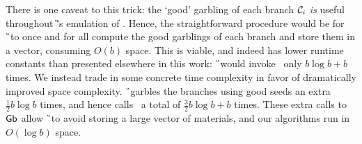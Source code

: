There is one caveat to this trick:
the `good' garbling of each branch $\mathcal C_i$ \emph{is} useful throughout \G's
emulation of \E.
Hence, the straightforward procedure would be for \G\ to once and for
all compute the good garblings of each branch and store them in a
vector, consuming $O(b)$ space.
%
This is viable, and indeed has lower runtime constants than presented
elsewhere in this work: \G\ would invoke \gGb\ only $b \log b + b$ times.
%
We instead trade in some concrete time complexity in favor of
dramatically improved space complexity.
\G\ garbles the branches using good seeds an extra $\frac{1}{2} b\log
b$ times, and hence calls \gGb\ a total of $\frac{3}{2} b \log b + b$
times.
These extra calls to $\textsf{Gb}$ allow \G\ to avoid storing a large vector
of materials, and our algorithms run in $O(\log b)$ space.
